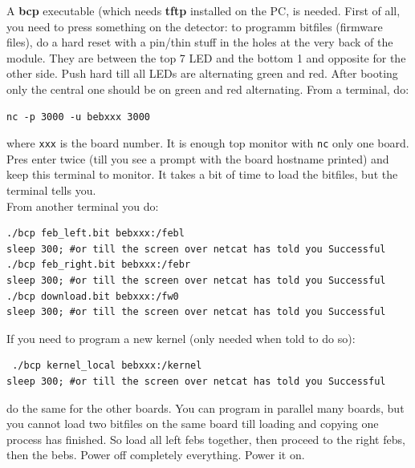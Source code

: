 \documentclass{article}
\begin{document}
A \textbf{bcp} executable (which needs \textbf{tftp} installed on the PC, is needed. First of all, you need to press something on the detector: to programm bitfiles (firmware files), do a hard reset with a pin/thin stuff in the holes at the very back of the module. They are between the top 7 LED and the bottom 1 and opposite for the other side. Push hard till all LEDs are alternating green and red. After booting only the central one should be on green and red alternating. From a terminal, do:
\begin{verbatim}
nc -p 3000 -u bebxxx 3000 
\end{verbatim} 
where {\tt{xxx}} is the board number. It is enough top monitor with {\tt{nc}} only one board. Pres enter twice (till you see a prompt with the board hostname printed) and keep this terminal to monitor. It takes a bit of time to load the bitfiles, but the terminal tells you.\\
From another terminal you do:
\begin{verbatim}
./bcp feb_left.bit bebxxx:/febl
sleep 300; #or till the screen over netcat has told you Successful
./bcp feb_right.bit bebxxx:/febr
sleep 300; #or till the screen over netcat has told you Successful
./bcp download.bit bebxxx:/fw0
sleep 300; #or till the screen over netcat has told you Successful
\end{verbatim}
If you need to program a new kernel (only needed when told to do so):
\begin{verbatim}
 ./bcp kernel_local bebxxx:/kernel
sleep 300; #or till the screen over netcat has told you Successful
\end{verbatim}
do the same for the other boards. You can program in parallel many boards, but you cannot load two bitfiles on the same board till loading and copying one process has finished. So load all left febs together, then proceed to the right febs, then the bebs. Power off completely everything. Power it on.
\end{document}
